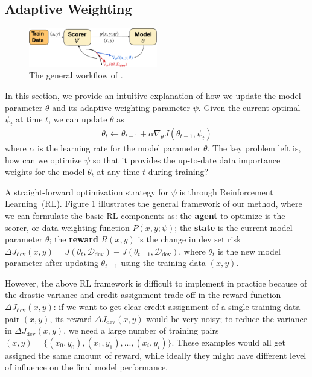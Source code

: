 \subsection{\label{sec:efficient_reward} Adaptive Weighting}
\begin{figure}
    \centering
    \includegraphics[width=0.5\textwidth]{figs/method_plot_crop.pdf}
    \caption{The general workflow of \dds.}
    \label{fig:method}
\end{figure}

In this section, we provide an intuitive explanation of how we update the model parameter $\theta$ and its adaptive weighting parameter $\psi$. Given the current optimal $\psi_t$ at time $t$, we can update $\theta$ as
\begin{align}
    \label{eqn:theta_update}
    \theta_t \leftarrow \theta_{t-1} + \alpha \nabla_\theta J(\theta_{t-1}, \psi_t)
\end{align}
where $\alpha$ is the learning rate for the model parameter $\theta$. The key problem left is, how can we optimize $\psi$ so that it provides the up-to-date data importance weights for the model $\theta_t$ at any time $t$ during training?

A straight-forward optimization strategy for $\psi$ is through Reinforcement Learning~(RL). Figure \ref{fig:method} illustrates the general framework of our method, where we can formulate the basic RL components as: the \textbf{agent} to optimize is the scorer, or data weighting function $P(x, y; \psi)$; the \textbf{state} is the current model parameter $\theta$; the \textbf{reward} $R(x, y)$ is the change in dev set risk $\Delta J_{\text{dev}}(x, y) = J(\theta_t, \mathcal{D}_\text{dev}) - J(\theta_{t-1}, \mathcal{D}_\text{dev})$, where $\theta_t$ is the new model parameter after updating $\theta_{t-1}$ using the training data $(x, y)$.

However, the above RL framework is difficult to implement in practice because of the drastic variance and credit assignment trade off in the reward function $\Delta J_{\text{dev}}(x, y)$: if we want to get clear credit assignment of a single training data pair $(x, y)$, its reward $\Delta J_{\text{dev}}(x, y)$ would be very noisy; to reduce the variance in $\Delta J_{\text{dev}}(x, y)$, we need a large number of training pairs $(x, y) = \{(x_0, y_0), (x_1, y_1), ..., (x_i, y_i)\}$. These examples would all get assigned the same amount of reward, while ideally they might have different level of influence on the final model performance.

